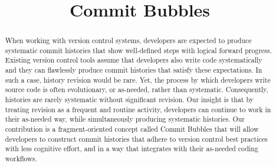 \documentclass[conference]{IEEEtran}
\begin{document}
%

\title{Commit Bubbles}



\author{
}


\maketitle

\begin{abstract}
When working with version control systems, developers are expected to produce systematic commit histories that show well-defined steps with logical forward progress. 
Existing version control tools assume that developers also write code systematically
and they can flawlessly
produce commit histories that satisfy these expectations.
In such a case, history revision would be rare. Yet, the process by which developers write source code is often evolutionary, or as-needed, rather than systematic.  Consequently, histories are rarely systematic without significant revision. Our insight is that by treating revision as a frequent and routine activity, developers can continue to work in their as-needed way, while simultaneously producing systematic histories. 
Our contribution is a fragment-oriented concept called Commit Bubbles that will allow developers to construct commit histories that adhere to version control best practices with less cognitive effort, and in a way that integrates with their as-needed coding workflows.
\end{abstract}


%
\IEEEpeerreviewmaketitle
\end{document}
